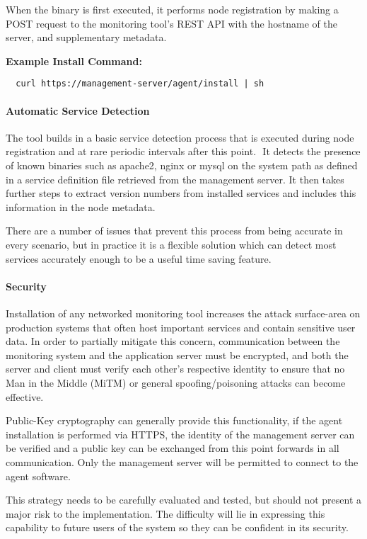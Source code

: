 \documentclass{cshonours}
\begin{document}
When the binary is first executed, it performs node registration by making a POST request to the monitoring tool’s REST API with the hostname of the server, and supplementary metadata.

\textbf{Example Install Command:}
\begin{verbatim}
  curl https://management-server/agent/install | sh
\end{verbatim}

\paragraph{Automatic Service Detection} The tool builds in a basic service detection process that is executed during node registration and at rare periodic intervals after this point. 
 It detects the presence of known binaries such as apache2, nginx or mysql on the system path as defined in a service definition file retrieved from the management server. It then takes further steps to extract version numbers from installed services and includes this information in the node metadata.

There are a number of issues that prevent this process from being accurate in every scenario, but in practice it is a flexible solution which can detect most services accurately enough to be a useful time saving feature.

\paragraph{Security} Installation of any networked monitoring tool increases the attack surface-area on production systems that often host important services and contain sensitive user data. In order to partially mitigate this concern, communication between the monitoring system and the application server must be encrypted, and both the server and client must verify each other’s respective identity to ensure that no Man in the Middle (MiTM) or general spoofing/poisoning attacks can become effective.

Public-Key cryptography can generally provide this functionality, if the agent installation is performed via HTTPS, the identity of the management server can be verified and a public key can be exchanged from this point forwards in all communication. Only the management server will be permitted to connect to the agent software.

This strategy needs to be carefully evaluated and tested, but should not present a major risk to the implementation. The difficulty will lie in expressing this capability to future users of the system so they can be confident in its security.
\end{document}
